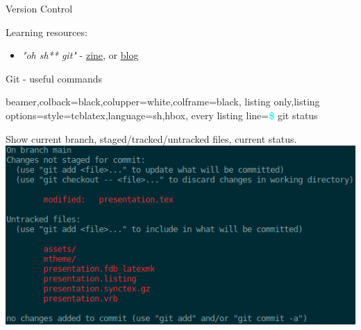 \documentclass{beamer} %
\begin{document}
\begin{frame}{Version Control}
    \vspace{1cm}

    Learning resources:
    \begin{itemize}
      \item \textit{"oh sh** git"} - \href{https://wizardzines.com/zines/oh-shit-git/}{\underline{zine}}, or \href{https://ohshitgit.com/}{\underline{blog}}
    \end{itemize}

  \end{frame}

  \begin{frame}[fragile]{Git - useful commands}
    \begin{tcblisting}{beamer,colback=black,colupper=white,colframe=black,
      listing only,listing options={style=tcblatex,language=sh},hbox,
      every listing line={\textcolor{cyan}{\small\ttfamily\bfseries\$}}}
      git status
    \end{tcblisting}
    Show current branch, staged/tracked/untracked files, current status.
    \includegraphics[height=.6\textheight]{git_status_output.png}
  \end{frame}
\end{document}
